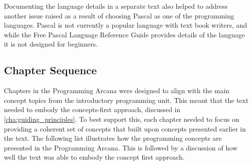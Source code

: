 Documenting the language details in a separate text also helped to address another issue raised as a result of choosing Pascal as one of the programming languages. Pascal is not currently a popular language with text book writers, and while the Free Pascal Language Reference Guide \cite{FPC:2013lang} provides details of the language it is not designed for beginners.


\subsection{Chapter Sequence} %
\label{ssub:chapter_sequence}

Chapters in the Programming Arcana were designed to align with the main concept topics from the introductory programming unit. This meant that the text needed to embody the concepts-first approach,  discussed in \cref{cha:guiding_principles}. To best support this, each chapter needed to focus on providing a coherent set of concepts that built upon concepts presented earlier in the text. The following list illustrates how the programming concepts are presented in the Programming Arcana. This is followed by a discussion of how well the text was able to embody the concept first approach.

